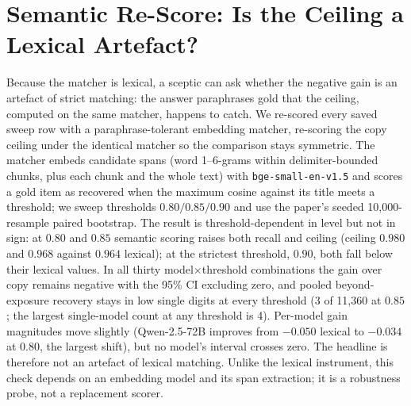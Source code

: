 \documentclass[10pt,twocolumn]{article}
\begin{document}
\section{Semantic Re-Score: Is the Ceiling a Lexical Artefact?}\label{sec:rescore}
Because the matcher is lexical, a sceptic can ask whether the negative gain is an artefact of strict matching: the answer paraphrases gold that the ceiling, computed on the same matcher, happens to catch. We re-scored every saved sweep row with a paraphrase-tolerant embedding matcher, re-scoring the copy ceiling under the identical matcher so the comparison stays symmetric. The matcher embeds candidate spans (word 1--6-grams within delimiter-bounded chunks, plus each chunk and the whole text) with \texttt{bge-small-en-v1.5} and scores a gold item as recovered when the maximum cosine against its title meets a threshold; we sweep thresholds $0.80/0.85/0.90$ and use the paper's seeded 10{,}000-resample paired bootstrap. The result is threshold-dependent in level but not in sign: at $0.80$ and $0.85$ semantic scoring raises both recall and ceiling (ceiling $0.980$ and $0.968$ against $0.964$ lexical); at the strictest threshold, $0.90$, both fall below their lexical values. In all thirty model$\times$threshold combinations the gain over copy remains negative with the 95\% CI excluding zero, and pooled beyond-exposure recovery stays in low single digits at every threshold (3 of 11{,}360 at $0.85$; the largest single-model count at any threshold is 4). Per-model gain magnitudes move slightly (Qwen-2.5-72B improves from $-0.050$ lexical to $-0.034$ at $0.80$, the largest shift), but no model's interval crosses zero. The headline is therefore not an artefact of lexical matching. Unlike the lexical instrument, this check depends on an embedding model and its span extraction; it is a robustness probe, not a replacement scorer.
\end{document}
